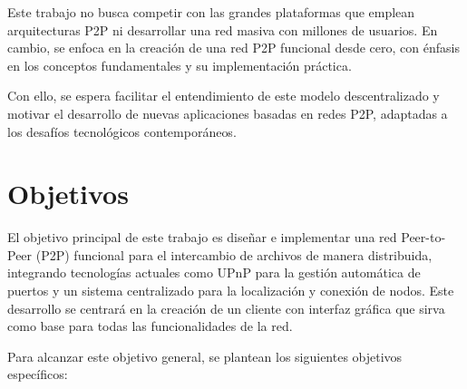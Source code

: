 Este trabajo no busca competir con las grandes plataformas que emplean arquitecturas P2P ni desarrollar una red masiva con millones de usuarios.
En cambio, se enfoca en la creación de una red P2P funcional desde cero, con énfasis en los conceptos fundamentales y su implementación práctica.

Con ello, se espera facilitar el entendimiento de este modelo descentralizado y motivar el desarrollo de nuevas aplicaciones basadas en redes P2P,
adaptadas a los desafíos tecnológicos contemporáneos.


\section{Objetivos}

El objetivo principal de este trabajo es diseñar e implementar una red Peer-to-Peer (P2P) funcional para el intercambio de archivos de manera distribuida,
integrando tecnologías actuales como UPnP para la gestión automática de puertos y un sistema centralizado para la localización y conexión de nodos.
Este desarrollo se centrará en la creación de un cliente con interfaz gráfica que sirva como base para todas las funcionalidades de la red.

Para alcanzar este objetivo general, se plantean los siguientes objetivos específicos:

